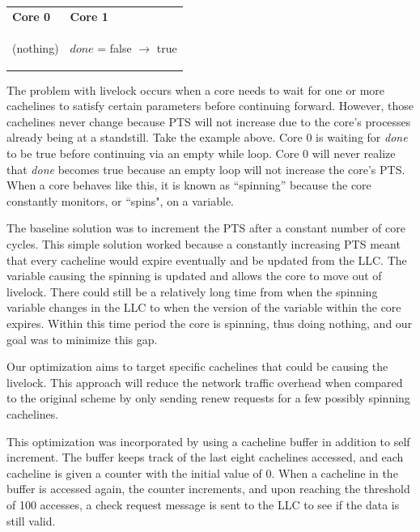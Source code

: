 \documentclass[12pt]{article}
\begin{document}
\begin{center} 
	
	\begin{tabular}{p{5cm} p{5cm}}
		\textbf{Core 0} & \textbf{Core 1} \\
		\begin{algorithm}[H]
			\While{!done}
			{(nothing)}
			
		\end{algorithm}
		&
		\begin{algorithm}[H]
			$done$ = false $\rightarrow$  true
		\end{algorithm}
		\\
	\end{tabular}
	
\end{center}
The problem with livelock occurs when a core needs to wait for one or 
more cachelines to satisfy certain parameters before continuing 
forward. However, those cachelines never change because PTS will not  
increase due to the core's processes already being at a standstill. Take  the example above. Core 0 is waiting for \textit{done} to  
be true before continuing via an empty while loop. Core 0 will never 
realize that \textit{done} becomes true because an empty loop will not increase 
the core's PTS. When a core behaves like this, it is known as 
``spinning'' because the core constantly monitors, or ``spins", on a 
variable. 

The baseline solution was to increment the PTS after a constant number 
of core cycles. This simple solution worked because a constantly 
increasing PTS meant that every cacheline would expire eventually and 
be updated from the LLC. The variable causing the spinning is updated 
and allows the core to move out of livelock. There could still be 
a relatively long time from when the spinning variable changes in the 
LLC to when the version of the variable within the core expires.  
Within this time period the core is spinning, thus doing nothing, and 
our goal was to minimize this gap. 
	
	
Our optimization aims to target specific cachelines that could be 
causing the livelock. This approach will reduce the network traffic 
overhead when compared to the original scheme by only sending renew 
requests for a few possibly spinning cachelines.
	
This optimization was incorporated by using a cacheline buffer in 
addition to self increment. The buffer keeps track of the last eight 
cachelines accessed, and each cacheline is given a counter with 
the initial value of 0. When a cacheline in the buffer is accessed 
again, the counter increments, and upon reaching the threshold of 
100 accesses, a check request message is sent to the LLC to see if the data is 
still valid.
    
\end{document}
